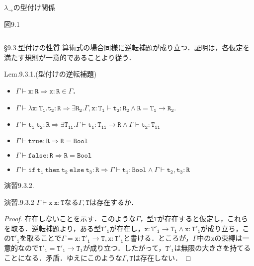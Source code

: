 \documentclass[9pt]{beamer}
\begin{document}
\begin{frame}{$\lambda_{\rightarrow}$の型付け関係}
\begin{dblock}{図9.1}
\begin{columns}
\begin{column}{0.6\textwidth}
\begin{prooftree}
		\end{prooftree}
		\begin{prooftree}
		\end{prooftree}
		\begin{prooftree}
\end{prooftree}
\end{column}
\end{columns}
\end{dblock}
\end{frame}
\begin{frame}{\S9.3.型付けの性質}
算術式の場合同様に逆転補題が成り立つ．証明は，各仮定を満たす規則が一意的であることより従う．
\begin{alertblock}{Lem.9.3.1.(型付けの逆転補題)}
\begin{itemize}
\item $\Gamma\vdash\mathtt{x:R}\Longrightarrow \mathtt{x:R}\in\Gamma$．
\item $\Gamma\vdash\mathtt{\lambda x:T_{1}.t_{2}:R}\Longrightarrow\exists \mathtt{R_{2}}. \Gamma, \mathtt{x:T_{1}\vdash t_{2}:R_{2}\land R = T_{1}\rightarrow R_{2}}$.
\item $\Gamma\vdash\mathtt{t_{1}\ t_{2}:R}\Longrightarrow\exists \mathtt{T_{11}}.\Gamma\vdash \mathtt{t_{1}:T_{11}\rightarrow R}\land \Gamma\vdash\mathtt{t_{2}:\mathtt{T_{11}}}$
\item $\Gamma\vdash \mathtt{true:R}\Longrightarrow \mathtt{R = Bool}$
\item $\Gamma\vdash \mathtt{false:R}\Longrightarrow \mathtt{R = Bool}$
\item $\Gamma\vdash\mathtt{if\ t_{1}\ then\ t_{2}\ else\ t_{3}:R}\Longrightarrow\Gamma\vdash\mathtt{t_{1}:Bool}\land\Gamma\vdash\mathtt{t_{2},t_{3}:R}$
\end{itemize}
\end{alertblock}
\end{frame}
\begin{frame}{演習9.3.2.}
\begin{alertblock}{演習.9.3.2}
$\Gamma \vdash\mathtt{x\ x:T}$なる$\Gamma, \mathtt{T}$は存在するか．
\end{alertblock}
\begin{proof}
存在しないことを示す．このような$\Gamma$，型$\mathtt{T}$が存在すると仮定し，これらを取る．逆転補題より，ある型$\mathtt{T'_{1}}$が存在し，$\mathtt{x:T'_{1}\rightarrow T_{1}}\land \mathtt{x:T'_{1}}$が成り立ち，この$\mathtt{T'_{1}}$を取ることで$\Gamma = \mathtt{x: T'_{1}\rightarrow T, x: T'_{1}}$と書ける．ところが，$\Gamma$中の$\mathtt{x}$の束縛は一意的なので$\mathtt{T'_{1} = T'_{1}\rightarrow T_{1}}$が成り立つ．したがって，$\mathtt{T'_{1}}$は無限の大きさを持てることになる．矛盾．ゆえにこのような$\Gamma,\mathtt{T}$は存在しない．
\end{proof}
\end{frame}
\end{document}
